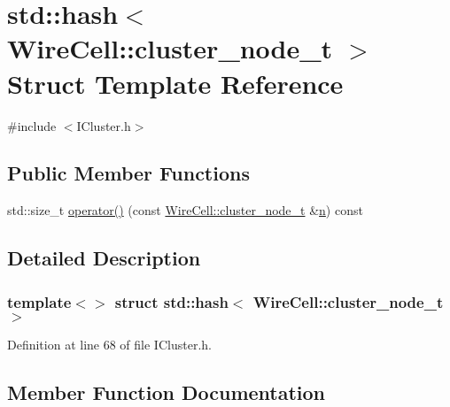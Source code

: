 \hypertarget{structstd_1_1hash_3_01_wire_cell_1_1cluster__node__t_01_4}{}\section{std\+:\+:hash$<$ Wire\+Cell\+:\+:cluster\+\_\+node\+\_\+t $>$ Struct Template Reference}
\label{structstd_1_1hash_3_01_wire_cell_1_1cluster__node__t_01_4}


{\ttfamily \#include $<$I\+Cluster.\+h$>$}

\subsection*{Public Member Functions}
\begin{DoxyCompactItemize}
\item 
std\+::size\+\_\+t \hyperlink{structstd_1_1hash_3_01_wire_cell_1_1cluster__node__t_01_4_a7334cc95bced4aa6c7f84ea08f796f8b}{operator()} (const \hyperlink{struct_wire_cell_1_1cluster__node__t}{Wire\+Cell\+::cluster\+\_\+node\+\_\+t} \&\hyperlink{format_8h_a9ab7e5832cef391eb8b1505a601fb215}{n}) const
\end{DoxyCompactItemize}


\subsection{Detailed Description}
\subsubsection*{template$<$$>$\newline
struct std\+::hash$<$ Wire\+Cell\+::cluster\+\_\+node\+\_\+t $>$}



Definition at line 68 of file I\+Cluster.\+h.



\subsection{Member Function Documentation}
\mbox{\label{structstd_1_1hash_3_01_wire_cell_1_1cluster__node__t_01_4_a7334cc95bced4aa6c7f84ea08f796f8b}} 
